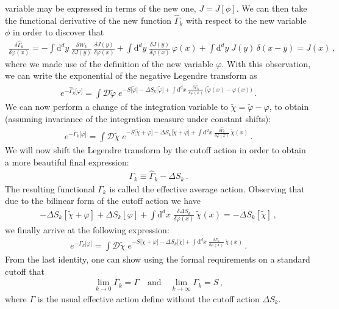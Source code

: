 \documentclass[11pt]{book}
\numberwithin{equation}{chapter}
\begin{document}
variable may be expressed in terms of the new one, $J=J[\phi]$.
We can then take the functional derivative of the new function
$\hat \Gamma_k$ with respect to the new variable $\phi$ in order
to discover that
\begin{align}
  \frac{ \delta \hat \Gamma_k }{ \delta \varphi (x) }
  = - \int \mathrm d^dy \; \frac{ \delta W_k }{ \delta J(y) } \,
  \frac{ \delta J(y) }{ \delta \varphi(x) }
  + \int \mathrm d^dy \; \frac{ \delta J(y) }{ \delta \varphi(x) } \, \varphi(x)
  + \int \mathrm d^dy \; J(y) \, \delta(x-y)
  = J(x) \,,
\end{align}
where we made use of the definition of the new variable $\varphi$.
With this observation,
we can write the exponential of the negative Legendre transform as
\begin{align}
  e^{ - \hat \Gamma_k \lbrack \varphi \rbrack }
  = \int \mathcal D \tilde \varphi \;
  e^{
    - S \lbrack \tilde \varphi \rbrack
    - \Delta S_k \lbrack \tilde \varphi \rbrack
    + \int \mathrm d^dx \;
    \frac{ \delta \hat \Gamma_k }{ \delta \varphi (x) }
    \, \big( \tilde \varphi(x) - \varphi(x) \big)
  } \,.
\end{align}
We can now perform a change of the integration variable
to $\tilde \chi = \tilde \varphi - \varphi$, to obtain
(assuming invariance of the integration measure under
constant shifts):
\begin{align}
  e^{ - \hat \Gamma_k \lbrack \varphi \rbrack }
  = \int \mathcal D \tilde \chi \;
  e^{
    - S \lbrack \tilde \chi + \varphi \rbrack
    - \Delta S_k \lbrack \tilde \chi + \varphi \rbrack
    + \int \mathrm d^dx \;
    \frac{ \delta \hat \Gamma_k }{ \delta \varphi (x) }
    \, \tilde \chi(x)
  } \,.
\end{align}
We will now shift the Legendre transform by the
cutoff action in order to obtain a more beautiful final
expression:
\begin{align}
  \Gamma_k \equiv \hat \Gamma_k - \Delta S_k \,.
\end{align}
The resulting functional $\Gamma_k$ is called the
effective average action.
Observing that due to the bilinear form of the cutoff action
we have
\begin{align}
  - \Delta S_k [ \tilde \chi + \varphi ]
  + \Delta S_k [ \varphi ]
  + \int \mathrm d^dx \;
  \frac{ \delta \Delta S_k }{ \delta \varphi (x) }
  \, \tilde \chi(x)
  = - \Delta S_k [ \tilde \chi ] \,,
\end{align}
we finally arrive at the following expression:
\begin{align}
  e^{ - \Gamma_k \lbrack \varphi \rbrack }
  = \int \mathcal D \tilde \chi \;
  e^{
    - S \lbrack \tilde \chi + \varphi \rbrack
    - \Delta S_k \lbrack \tilde \chi \rbrack
    + \int \mathrm d^dx \;
    \frac{ \delta \Gamma_k }{ \delta \varphi (x) }
    \, \tilde \chi(x)
  } \,.
\end{align}
From the last identity, one can show using the
formal requirements on a standard cutoff that
\begin{align}
  \lim_{k \rightarrow 0} \Gamma_k = \Gamma
  \quad \text{and} \quad
  \lim_{k \rightarrow \infty} \Gamma_k = S \,,
\end{align}
where $\Gamma$ is the usual effective action
define without the cutoff action $\Delta S_k$.
\end{document}
